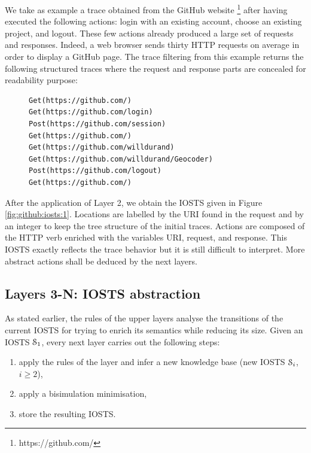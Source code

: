 \begin{example}
We take as example a trace obtained from the GitHub website
\footnote{https://github.com/} after having executed the
following actions: login with an existing account, choose an
existing project, and logout. These few actions already produced
a large set of requests and responses. Indeed, a web browser
sends thirty HTTP requests on average in order to display a
GitHub page. The trace filtering from this example returns the
following structured traces where the request and response parts
are concealed for readability purpose:

\begin{figure}[ht]
\begin{BVerbatim}
Get(https://github.com/)
Get(https://github.com/login)
Post(https://github.com/session)
Get(https://github.com/)
Get(https://github.com/willdurand)
Get(https://github.com/willdurand/Geocoder)
Post(https://github.com/logout)
Get(https://github.com/)
\end{BVerbatim}
\end{figure}

After the application of Layer 2, we obtain the IOSTS given in Figure
\ref{fig:github:iosts:1}. Locations are labelled by the URI found
in the request and by an integer to keep the tree structure of
the initial traces. Actions are composed of the HTTP verb
enriched with the variables URI, request, and response. This
IOSTS exactly reflects the trace behavior but it is still
difficult to interpret. More abstract actions shall be deduced by
the next layers.
\end{example}


\subsection{Layers 3-N: IOSTS abstraction}
\label{sec:modelinf:webapps:L4}

As stated earlier, the rules of the upper layers analyse the
transitions of the current IOSTS for trying to enrich its
semantics while reducing its size. Given an IOSTS
$\EuScript{S}_1$, every next layer carries out the following
steps:

\begin{enumerate}
\item apply the rules of the layer and infer a new knowledge base
(new IOSTS $\EuScript{S}_i$, $i\geq 2$),

\item apply a bisimulation minimisation,

\item store the resulting IOSTS.
\end{enumerate}

